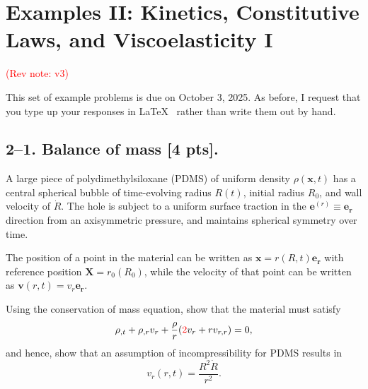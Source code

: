 \setcounter{section}{1} %


\section*{Examples II: Kinetics, Constitutive Laws, and Viscoelasticity I}
\label{PS2}
\textcolor{red}{(Rev note: v3)}


This set of example problems is due on October 3, 2025. 
As before, I request that you type up your responses in \LaTeX~ rather than write them out by hand. 

\medskip
\subsection*{2--1. \textbf{Balance of mass} [4 pts].} 
A large piece of polydimethylsiloxane (PDMS) of uniform density $\rho(\bm{x},t)$ has a central spherical bubble of time-evolving radius $R(t)$, initial radius $R_0$, and wall velocity of $\dot{R}$. 
The hole is subject to a uniform surface traction in the $\bm{e}^{(r)} \equiv \bm{e}_{\bm{r}}$ direction from an axisymmetric pressure, and maintains spherical symmetry over time. 

\medskip
The position of a point in the material can be written as $\bm{x} = r(R,t) \bm{e}_{\bm{r}}$ with reference position $\bm{X} = r_0(R_0)$, while the velocity of that point can be written as $\bm{v}(r,t) = v_r \bm{e}_{\bm{r}}$.

\medskip
Using the conservation of mass equation, show that the material must satisfy
\begin{equation*}
\rho_{,t}+ \rho_{,r} v_r + \frac{\rho}{r} (\textcolor{red}{2}v_r + r v_{r,r}) = 0,
\end{equation*}
and hence, show that an assumption of incompressibility for PDMS results in 
\begin{equation*}
v_r(r,t) = \frac{R^2 \dot{R}}{r^2}.
\end{equation*}


